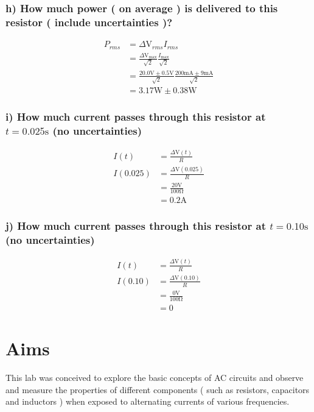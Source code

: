 \documentclass{report}
\begin{document}
\subsection*{h) How much power ( on average ) is delivered to this resistor ( include uncertainties )?}
    \begin{align}
        P_{rms}&=\Delta\si{\volt}_{rms}I_{rms}\nonumber\\
               &=\frac{\Delta\si{\volt}_{\max}}{\sqrt{2}}\frac{I_{\max}}{\sqrt{2}}\nonumber\\
               &=\frac{20.0\si{\volt}\pm0.5\si{\volt}}{\sqrt{2}}\frac{200\si{\milli\ampere}\pm9\si{\milli\ampere}}{\sqrt{2}}\nonumber\\
        &=3.17\si{\watt}\pm0.38\si{\watt}
    \end{align}

\subsection*{i) How much current passes through this resistor at $t = 0.025\si{\second}$ (no uncertainties) }
    \begin{align}
        I(t)&=\frac{\Delta\si{\volt}(t)}{R}\nonumber\\
        I(0.025)&=\frac{\Delta\si{\volt}(0.025)}{R}\nonumber\\
        &=\frac{20\si{\volt}}{100\si{\ohm}}\nonumber\\
        &=0.2\si{\ampere}
    \end{align}

\subsection*{j) How much current passes through this resistor at $t = 0.10\si{\second}$ (no uncertainties) }
    \begin{align}
        I(t)&=\frac{\Delta\si{\volt}(t)}{R}\nonumber\\
        I(0.10)&=\frac{\Delta\si{\volt}(0.10)}{R}\nonumber\\
        &=\frac{0\si{\volt}}{100\si{\ohm}}\nonumber\\
        &=0
    \end{align}

\chapter{Aims}

This lab was conceived to explore the basic concepts of AC circuits and observe and measure the properties of different components ( such as resistors, capacitors and inductors ) when exposed to alternating currents of various frequencies. 
\end{document}
